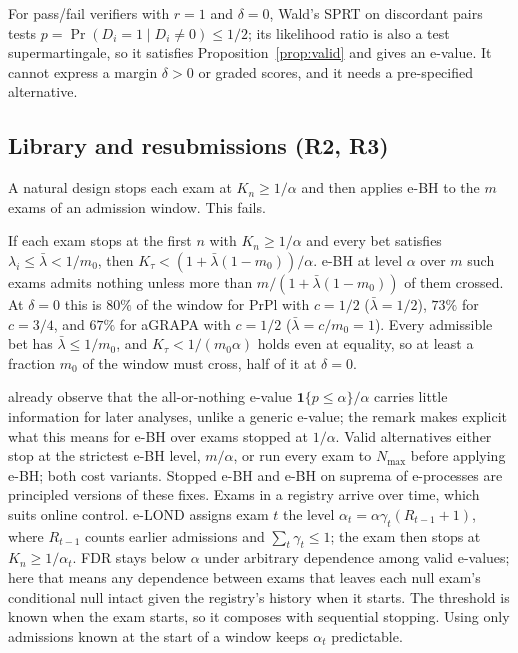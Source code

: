 For pass/fail verifiers with $r=1$ and $\delta=0$, Wald's SPRT on discordant pairs tests $p=\Pr(D_i=1\mid D_i\ne0)\le1/2$; its likelihood ratio is also a test supermartingale, so it satisfies Proposition~\ref{prop:valid} and gives an e-value. It cannot express a margin $\delta>0$ or graded scores, and it needs a pre-specified alternative.

\subsection{Library and resubmissions (R2, R3)}
A natural design stops each exam at $K_n\ge1/\alpha$ and then applies e-BH \citep{wang2022ebh} to the $m$ exams of an admission window. This fails.
\begin{remark}\label{prop:ebh}
If each exam stops at the first $n$ with $K_n\ge1/\alpha$ and every bet satisfies $\lambda_i\le\bar\lambda<1/m_0$, then $K_\tau<(1+\bar\lambda(1-m_0))/\alpha$. e-BH at level $\alpha$ over $m$ such exams admits nothing unless more than $m/(1+\bar\lambda(1-m_0))$ of them crossed. At $\delta=0$ this is $80\%$ of the window for PrPl with $c=1/2$ ($\bar\lambda=1/2$), $73\%$ for $c=3/4$, and $67\%$ for aGRAPA with $c=1/2$ ($\bar\lambda=c/m_0=1$). Every admissible bet has $\bar\lambda\le1/m_0$, and $K_\tau<1/(m_0\alpha)$ holds even at equality, so at least a fraction $m_0$ of the window must cross, half of it at $\delta=0$.
\end{remark}
\citet{wang2022ebh} already observe that the all-or-nothing e-value $\mathbf 1\{p\le\alpha\}/\alpha$ carries little information for later analyses, unlike a generic e-value; the remark makes explicit what this means for e-BH over exams stopped at $1/\alpha$. Valid alternatives either stop at the strictest e-BH level, $m/\alpha$, or run every exam to $N_{\max}$ before applying e-BH; both cost variants. Stopped e-BH \citep{wang2025stopped} and e-BH on suprema of e-processes \citep{tavyrikov2025carefree} are principled versions of these fixes. Exams in a registry arrive over time, which suits online control. e-LOND \citep{xu2024online} assigns exam $t$ the level $\alpha_t=\alpha\gamma_t(R_{t-1}+1)$, where $R_{t-1}$ counts earlier admissions and $\sum_t\gamma_t\le1$; the exam then stops at $K_n\ge1/\alpha_t$. FDR stays below $\alpha$ under arbitrary dependence among valid e-values; here that means any dependence between exams that leaves each null exam's conditional null intact given the registry's history when it starts. The threshold is known when the exam starts, so it composes with sequential stopping. Using only admissions known at the start of a window keeps $\alpha_t$ predictable.

